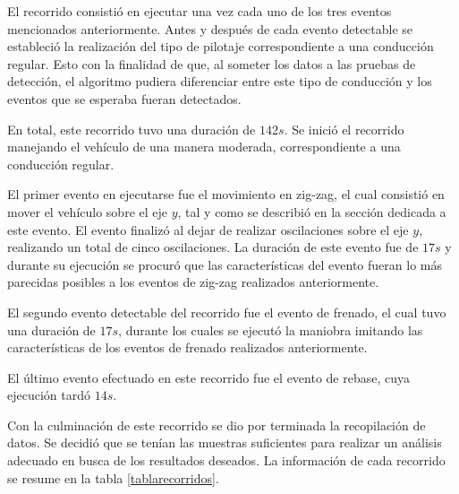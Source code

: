 El recorrido consistió en ejecutar una vez cada uno de los tres eventos mencionados anteriormente. 
Antes y después de cada evento detectable se estableció la realización del tipo de pilotaje correspondiente a una conducción regular. 
Esto con la finalidad de que, al someter los datos a las pruebas de detección, el algoritmo pudiera diferenciar entre este tipo de conducción y los eventos que se esperaba fueran detectados.

En total, este recorrido tuvo una duración de $142s$.
Se inició el recorrido manejando el vehículo de una manera moderada, correspondiente a una conducción regular.

El primer evento en ejecutarse fue el movimiento en zig-zag, el cual consistió en mover el vehículo sobre el eje $y$, tal y como se describió en la sección dedicada a este evento.
El evento finalizó al dejar de realizar oscilaciones sobre el eje $y$, realizando un total de cinco oscilaciones. 
La duración de este evento fue de $17s$ y durante su ejecución se procuró que las características del evento fueran lo más parecidas posibles a los eventos de zig-zag realizados anteriormente.

El segundo evento detectable del recorrido fue el evento de frenado, el cual tuvo una duración de $17s$, durante los cuales se ejecutó la maniobra imitando las características de los eventos de frenado realizados anteriormente.

El último evento efectuado en este recorrido fue el evento de rebase, cuya ejecución tardó $14s$. 


Con la culminación de este recorrido se dio por terminada la recopilación de datos. 
Se decidió que se tenían las muestras suficientes para realizar un análisis adecuado en busca de los resultados deseados.
La información de cada recorrido se resume en la tabla \ref{tablarecorridos}.\\

\renewcommand{\arraystretch}{1.5}

